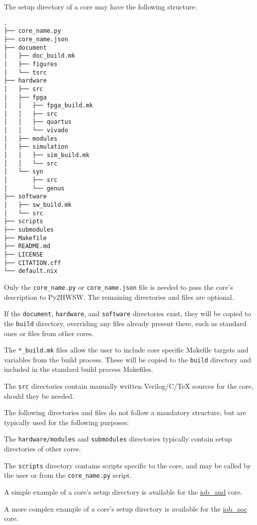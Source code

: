 %

The setup directory of a core may have the following structure:

\begin{verbatim}
.
├── core_name.py
├── core_name.json
├── document
│   ├── doc_build.mk
│   ├── figures
│   └── tsrc
├── hardware
│   ├── src
│   ├── fpga
│   │   ├── fpga_build.mk
│   │   ├── src
│   │   ├── quartus
│   │   └── vivado
│   ├── modules
│   ├── simulation
│   │   ├── sim_build.mk
│   │   └── src
│   └── syn
│       ├── src
│       └── genus
├── software
│   ├── sw_build.mk
│   └── src
├── scripts
├── submodules
├── Makefile
├── README.md
├── LICENSE
├── CITATION.cff
└── default.nix
\end{verbatim}

Only the \texttt{core\_name.py} or \texttt{core\_name.json} file is needed to pass the core's description to Py2HWSW.
The remaining directories and files are optional.

If the \texttt{document}, \texttt{hardware}, and \texttt{software} directories exist, they will be copied to the \texttt{build} directory, overriding any files already present there, such as standard ones or files from other cores.

The \texttt{*\_build.mk} files allow the user to include core specific Makefile targets and variables from the build process.
These will be copied to the \texttt{build} directory and included in the standard build process Makefiles.

The \texttt{src} directories contain manually written Verilog/C/TeX sources for the core, should they be needed.

The following directories and files do not follow a mandatory structure, but are typically used for the following purposes:

The \texttt{hardware/modules} and \texttt{submodules} directories typically contain setup directories of other cores.

The \texttt{scripts} directory contains scripts specific to the core, and may be called by the user or from the \texttt{core\_name.py} script.

A simple example of a core's setup directory is available for the \href{https://github.com/IObundle/py2hwsw/tree/main/py2hwsw/lib/hardware/basic_tests/iob_and}{iob\_and} core.

A more complex example of a core's setup directory is available for the \href{https://github.com/IObundle/iob-soc}{iob\_soc} core.
